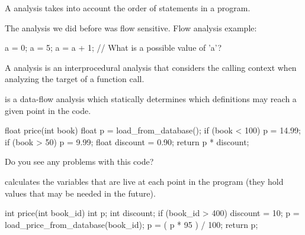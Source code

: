 \documentclass{article}
\begin{document}
\plush{}


A  analysis takes into account the order of statements in a program.

The analysis we did before was flow sensitive. Flow  analysis example:

{\small
\begin{ffcode}
a = 0;
a = 5;
a = a + 1;
// What is a possible value of 'a'?
\end{ffcode}
}

\plush{}


A  analysis is an interprocedural analysis that considers the calling context when analyzing the target of a function call.

{\small
{}
}

\plush{}



 is a data-flow analysis which statically determines which definitions may reach a given point in the code.

{\small
\begin{ffcode}
float price(int book) {
  float p = load_from_database();
  if (book < 100)
    p = 14.99;
  if (book > 50)
    p = 9.99;
  float discount = 0.90;
  return p * discount;
}
\end{ffcode}
}

Do you see any problems with this code?

\plush{}


 calculates the variables that are live at each point in the program (they hold values that may be needed in the future).

{\small
\begin{ffcode}
int price(int book_id) {
  int p;
  int discount;
  if (book_id > 400)
    discount = 10;
  p = load_price_from_database(book_id);
  p = ( p * 95 ) / 100;
  return p;
}
\end{ffcode}
}
\end{document}
